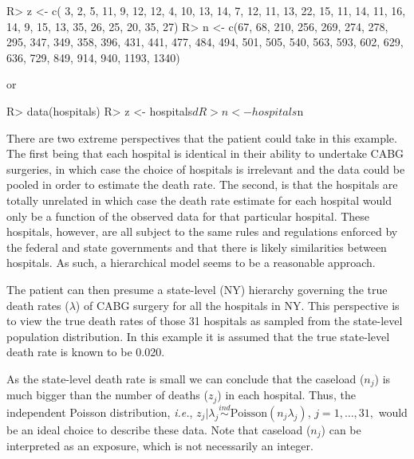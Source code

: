 \documentclass[article]{jss}
\begin{document}
\begin{CodeChunk}
\begin{CodeInput}
R> z <- c( 3, 2, 5, 11, 9, 12, 12, 4, 10, 13, 14, 7, 12, 11, 13, 22, 15, 
          11, 14, 11, 16, 14, 9, 15, 13, 35, 26, 25, 20, 35, 27)
R> n <- c(67, 68, 210, 256, 269, 274, 278, 295, 347, 349, 358, 396, 431,
         441, 477, 484, 494, 501, 505, 540, 563, 593, 602, 629, 636, 729,
         849, 914, 940, 1193, 1340)
\end{CodeInput}
\end{CodeChunk}
or
\begin{CodeChunk}
\begin{CodeInput}
R> data(hospitals)
R> z <- hospitals$d
R> n <- hospitals$n
\end{CodeInput}
\end{CodeChunk}


There are two extreme perspectives that the patient could take in this example. The first being that each hospital is identical in their ability to undertake CABG surgeries, in which case the choice of hospitals is irrelevant and the data could be pooled in order to estimate the death rate. The second, is that the hospitals are totally unrelated in which case the death rate estimate for each hospital would only be a function of the observed data for that particular hospital. These hospitals, however, are all subject to the same rules and regulations enforced by the federal and state governments and that there is likely similarities between hospitals. As such, a hierarchical model seems to be a reasonable approach. 


The patient can then presume a state-level (NY) hierarchy governing the true death rates ($\lambda$) of CABG surgery for all the hospitals in NY. This perspective is to view the true death rates of those 31 hospitals as sampled from the state-level population distribution. In this example it is assumed that the true state-level death rate is known to be 0.020. 

As the state-level death rate is small we can conclude that the caseload ($n_{j}$) is much bigger than the number of deaths ($z_{j}$) in each hospital. Thus, the independent Poisson distribution, \emph{i.e.},  $z_{j}\vert \lambda_{j}\stackrel{ind}{\sim} \textrm{Poisson}(n_{j}\lambda_{j})$, $j=1, \ldots, 31,$ would be an ideal choice to describe these data. Note that caseload  ($n_{j}$) can be interpreted as an exposure, which is not necessarily an integer.
\end{document}

